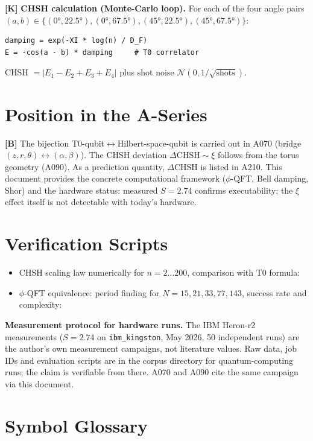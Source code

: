 \textbf{[K]} \textbf{CHSH calculation (Monte-Carlo loop).} For each of the four
angle pairs $(a,b)\in\{(0°,22{.}5°),(0°,67{.}5°),(45°,22{.}5°),(45°,67{.}5°)\}$:
\begin{verbatim}
damping = exp(-XI * log(n) / D_F)
E = -cos(a - b) * damping     # T0 correlator
\end{verbatim}
CHSH $= |E_1 - E_2 + E_3 + E_4|$ plus shot noise $\mathcal N(0,1/\sqrt{\text{shots}})$.

\section{Position in the A-Series}

\textbf{[B]} The bijection T0-qubit$\leftrightarrow$Hilbert-space-qubit is carried
out in A070 (bridge $(z,r,\theta)\leftrightarrow(\alpha,\beta)$). The CHSH
deviation $\Delta\text{CHSH}\sim\xi$ follows from the torus geometry (A090). As
a prediction quantity, $\Delta\text{CHSH}$ is listed in A210. This document
provides the concrete computational framework ($\phi$-QFT, Bell damping, Shor)
and the hardware status: measured $S=2{.}74$ confirms executability; the $\xi$
effect itself is not detectable with today's hardware.

\section{Verification Scripts}

\begin{itemize}[leftmargin=2em,itemsep=2pt,topsep=2pt]
  \item CHSH scaling law numerically for $n=2\ldots200$, comparison with T0 formula:
  \item $\phi$-QFT equivalence: period finding for $N=15,21,33,77,143$,
    success rate and complexity:
\end{itemize}

\textbf{Measurement protocol for hardware runs.} The IBM Heron-r2 measurements
($S=2{.}74$ on \texttt{ibm\_kingston}, May 2026, 50 independent runs) are the
author's own measurement campaigns, not literature values. Raw data, job IDs and
evaluation scripts are in the corpus directory for quantum-computing runs; the
claim is verifiable from there. A070 and A090 cite the same campaign via this
document.

\section{Symbol Glossary}

